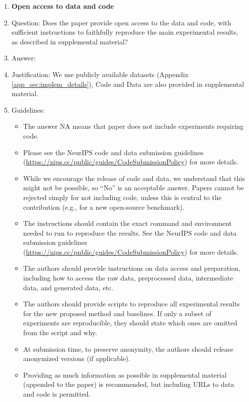 \documentclass{article}
\begin{document}
\begin{enumerate}
\item {\bf Open access to data and code}
    \item[] Question: Does the paper provide open access to the data and code, with sufficient instructions to faithfully reproduce the main experimental results, as described in supplemental material?
    \item[] Answer: \answerYes{} %
    \item[] Justification: We use publicly available datasets (Appendix \ref{app_sec:implem_details}), Code and Data are also provided in supplemental material.
    \item[] Guidelines:
    \begin{itemize}
        \item The answer NA means that paper does not include experiments requiring code.
        \item Please see the NeurIPS code and data submission guidelines (\url{https://nips.cc/public/guides/CodeSubmissionPolicy}) for more details.
        \item While we encourage the release of code and data, we understand that this might not be possible, so “No” is an acceptable answer. Papers cannot be rejected simply for not including code, unless this is central to the contribution (e.g., for a new open-source benchmark).
        \item The instructions should contain the exact command and environment needed to run to reproduce the results. See the NeurIPS code and data submission guidelines (\url{https://nips.cc/public/guides/CodeSubmissionPolicy}) for more details.
        \item The authors should provide instructions on data access and preparation, including how to access the raw data, preprocessed data, intermediate data, and generated data, etc.
        \item The authors should provide scripts to reproduce all experimental results for the new proposed method and baselines. If only a subset of experiments are reproducible, they should state which ones are omitted from the script and why.
        \item At submission time, to preserve anonymity, the authors should release anonymized versions (if applicable).
        \item Providing as much information as possible in supplemental material (appended to the paper) is recommended, but including URLs to data and code is permitted.
    \end{itemize}



\end{enumerate}
\end{document}

